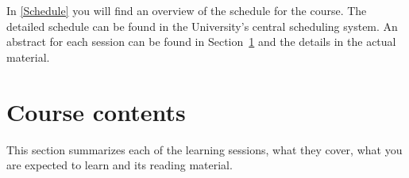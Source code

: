 In \cref{Schedule} you will find an overview of the schedule for the course.
The detailed schedule can be found in the University's central scheduling 
system.
An abstract for each session can be found in Section~\ref{CourseContents} and 
the details in the actual material.

\begin{frame}[allowframebreaks]

\end{frame}


\section{Course contents}%
\label{CourseContents}

This section summarizes each of the learning sessions, \ie what they cover, 
what you are expected to learn and its reading material.

